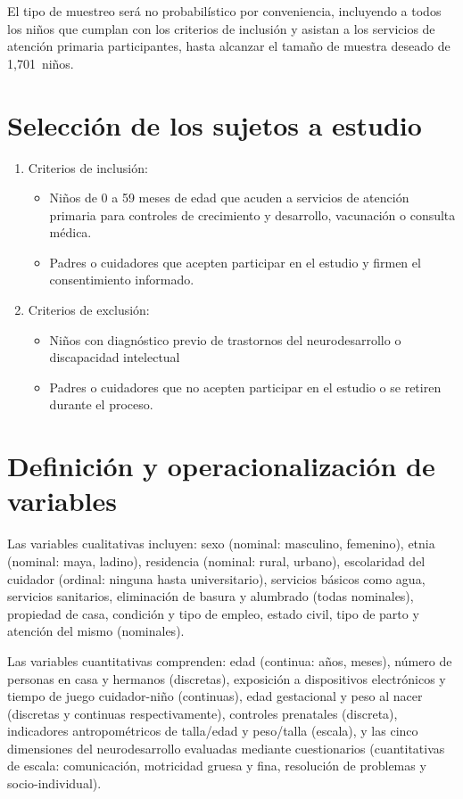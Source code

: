 \documentclass[11pt,letterpaper]{report}
\newcommand{\muestradeseada}{1,701}
\begin{document}
El tipo de muestreo será no probabilístico por conveniencia, incluyendo a todos
los niños que cumplan con los criterios de inclusión y asistan a los servicios
de atención primaria participantes, hasta alcanzar el tamaño
de muestra deseado de \muestradeseada\ niños.

\section{Selección de los sujetos a estudio}
	\begin{enumerate}
		\item Criterios de inclusión:
			\begin{itemize}
				\item Niños de 0 a 59 meses de edad que acuden a servicios de
				atención primaria para controles de crecimiento y desarrollo,
				vacunación o consulta médica.
				\item Padres o cuidadores que acepten participar en el estudio
				y firmen el consentimiento informado.
			\end{itemize}
		\item Criterios de exclusión:
			\begin{itemize}
				\item Niños con diagnóstico previo de trastornos del
				neurodesarrollo o discapacidad intelectual
				\item Padres o cuidadores que no acepten participar en el
				estudio o se retiren durante el proceso.
			\end{itemize}
	\end{enumerate}

\section{Definición y operacionalización de variables}
Las variables cualitativas incluyen: sexo (nominal: masculino, femenino), etnia
(nominal: maya, ladino), residencia (nominal: rural, urbano), escolaridad del
cuidador (ordinal: ninguna hasta universitario), servicios básicos como agua,
servicios sanitarios, eliminación de basura y alumbrado (todas nominales),
propiedad de casa, condición y tipo de empleo, estado civil, tipo de parto y
atención del mismo (nominales).

Las variables cuantitativas comprenden: edad (continua: años, meses), número de
personas en casa y hermanos (discretas), exposición a dispositivos electrónicos
y tiempo de juego cuidador-niño (continuas), edad gestacional y peso al nacer
(discretas y continuas respectivamente), controles prenatales (discreta),
indicadores antropométricos de talla/edad y peso/talla (escala), y las cinco
dimensiones del neurodesarrollo evaluadas mediante cuestionarios (cuantitativas
de escala: comunicación, motricidad gruesa y fina, resolución de problemas y
socio-individual).
\end{document}
